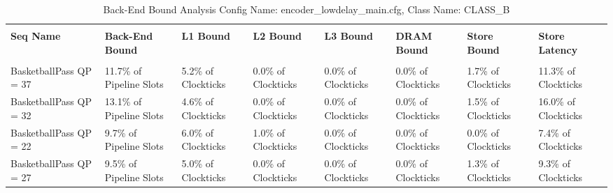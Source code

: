 \documentclass{article}%
\begin{document}
\begin{longtabu}{| X[l] | X[l] | X[l] | X[l] | X[l] | X[l] | X[l] | X[l] |}%
\caption{%
Back{-}End Bound Analysis\newline%
 Config Name: encoder\_lowdelay\_main.cfg,\newline%
 Class Name: CLASS\_B\newline%
%
}%
\hline%
&&&&&&&\\%
\textbf{Seq Name}&\textbf{Back{-}End Bound}&\textbf{L1 Bound}&\textbf{L2 Bound}&\textbf{L3 Bound}&\textbf{DRAM Bound}&\textbf{Store Bound}&\textbf{Store Latency}\\%
&&&&&&&\\%
\hline%
\endhead%
BasketballPass\newline%
 QP = 37&11.7\% of Pipeline Slots&5.2\% of Clockticks&0.0\% of Clockticks&0.0\% of Clockticks&0.0\% of Clockticks&1.7\% of Clockticks&11.3\% of Clockticks\\%
\hline%
BasketballPass\newline%
 QP = 32&13.1\% of Pipeline Slots&4.6\% of Clockticks&0.0\% of Clockticks&0.0\% of Clockticks&0.0\% of Clockticks&1.5\% of Clockticks&16.0\% of Clockticks\\%
\hline%
BasketballPass\newline%
 QP = 22&9.7\% of Pipeline Slots&6.0\% of Clockticks&1.0\% of Clockticks&0.0\% of Clockticks&0.0\% of Clockticks&0.0\% of Clockticks&7.4\% of Clockticks\\%
\hline%
BasketballPass\newline%
 QP = 27&9.5\% of Pipeline Slots&5.0\% of Clockticks&0.0\% of Clockticks&0.0\% of Clockticks&0.0\% of Clockticks&1.3\% of Clockticks&9.3\% of Clockticks\\%
\hline%
\end{longtabu}%
\newpage

%
\end{document}
